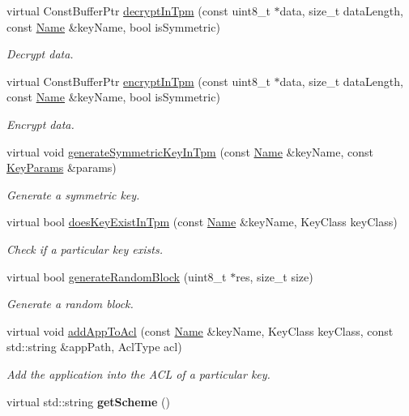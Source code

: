 \begin{DoxyCompactItemize}
virtual Const\+Buffer\+Ptr \hyperlink{classndn_1_1security_1_1DummyTpm_a96bf03dec857e1d1aeb0f9fbf355888f}{decrypt\+In\+Tpm} (const uint8\+\_\+t $\ast$data, size\+\_\+t data\+Length, const \hyperlink{classndn_1_1Name}{Name} \&key\+Name, bool is\+Symmetric)
\begin{DoxyCompactList}\small\item\em Decrypt data. \end{DoxyCompactList}\item 
virtual Const\+Buffer\+Ptr \hyperlink{classndn_1_1security_1_1DummyTpm_a0dbaa71473c356abb74cfd95c65306ce}{encrypt\+In\+Tpm} (const uint8\+\_\+t $\ast$data, size\+\_\+t data\+Length, const \hyperlink{classndn_1_1Name}{Name} \&key\+Name, bool is\+Symmetric)
\begin{DoxyCompactList}\small\item\em Encrypt data. \end{DoxyCompactList}\item 
virtual void \hyperlink{classndn_1_1security_1_1DummyTpm_adfd5054fd688cfb6e46f7b3adeaca5f3}{generate\+Symmetric\+Key\+In\+Tpm} (const \hyperlink{classndn_1_1Name}{Name} \&key\+Name, const \hyperlink{classndn_1_1KeyParams}{Key\+Params} \&params)
\begin{DoxyCompactList}\small\item\em Generate a symmetric key. \end{DoxyCompactList}\item 
virtual bool \hyperlink{classndn_1_1security_1_1DummyTpm_a548fe7b8965c5be3a3f989762e26ede9}{does\+Key\+Exist\+In\+Tpm} (const \hyperlink{classndn_1_1Name}{Name} \&key\+Name, Key\+Class key\+Class)
\begin{DoxyCompactList}\small\item\em Check if a particular key exists. \end{DoxyCompactList}\item 
virtual bool \hyperlink{classndn_1_1security_1_1DummyTpm_a893bac735343272b3b98061a127a9048}{generate\+Random\+Block} (uint8\+\_\+t $\ast$res, size\+\_\+t size)
\begin{DoxyCompactList}\small\item\em Generate a random block. \end{DoxyCompactList}\item 
virtual void \hyperlink{classndn_1_1security_1_1DummyTpm_afb9922039041ee3c9d0de0e32606ba31}{add\+App\+To\+Acl} (const \hyperlink{classndn_1_1Name}{Name} \&key\+Name, Key\+Class key\+Class, const std\+::string \&app\+Path, Acl\+Type acl)
\begin{DoxyCompactList}\small\item\em Add the application into the A\+CL of a particular key. \end{DoxyCompactList}\item 
virtual std\+::string {\bfseries get\+Scheme} ()\hypertarget{classndn_1_1security_1_1DummyTpm_a32a97d9c03b4366b593234b590d5c76d}{}\label{classndn_1_1security_1_1DummyTpm_a32a97d9c03b4366b593234b590d5c76d}


\end{DoxyCompactItemize}

